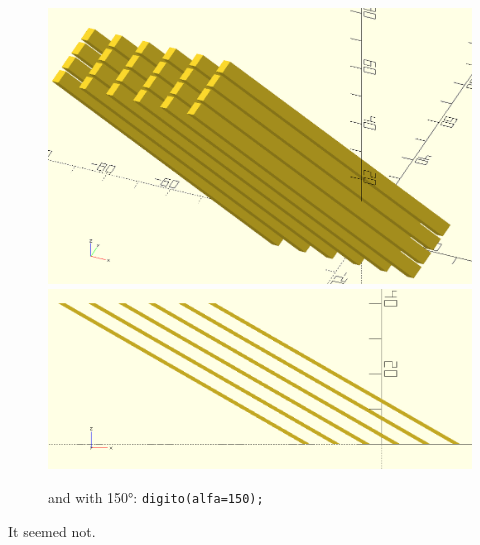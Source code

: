     \begin{figure}[h!]
    \centering
  \includegraphics[width=.49\textwidth]{imagenes/matriz-150}\hfill
  \includegraphics[width=.49\textwidth]{imagenes/matriz-150-perfil} 
    \caption{and with 150\si{\degree}: \lstinline!digito(alfa=150);!}%
    \label{fig:matriz-150}
  \end{figure}

It seemed not.




